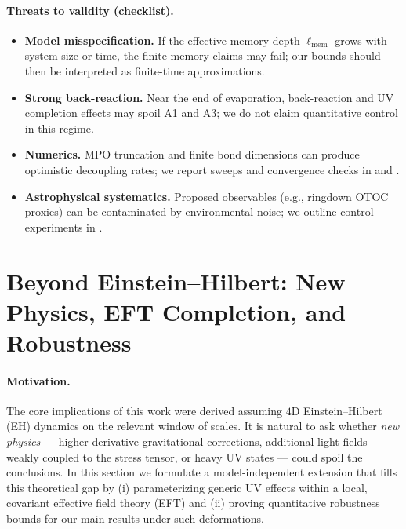 \documentclass[a4paper,11pt]{article}
\newcommand{\ellmem}{\ensuremath{\ell_{\mathrm{mem}}}}
\theoremstyle{plain}
\theoremstyle{definition}
\theoremstyle{remark}
\begin{document}
\paragraph{Threats to validity (checklist).}
\begin{itemize}[leftmargin=*,itemsep=0.25em]
  \item \textbf{Model misspecification.} If the effective memory depth $\ellmem$ grows with system size or time, the finite-memory claims may fail; our bounds should then be interpreted as finite-time approximations.
  \item \textbf{Strong back-reaction.} Near the end of evaporation, back-reaction and UV completion effects may spoil A1 and A3; we do not claim quantitative control in this regime.
  \item \textbf{Numerics.} MPO truncation and finite bond dimensions can produce optimistic decoupling rates; we report sweeps and convergence checks in  and .
  \item \textbf{Astrophysical systematics.} Proposed observables (e.g., ringdown OTOC proxies) can be contaminated by environmental noise; we outline control experiments in .
\end{itemize}






\section{Beyond Einstein--Hilbert: New Physics, EFT Completion, and Robustness}\label{sec:new-physics}

\paragraph{Motivation.} The core implications of this work were derived assuming $4$D Einstein--Hilbert (EH) dynamics on the relevant window of scales. It is natural to ask whether \emph{new physics} --- higher-derivative gravitational corrections, additional light fields weakly coupled to the stress tensor, or heavy UV states --- could spoil the conclusions. In this section we formulate a model-independent extension that fills this theoretical gap by (i) parameterizing generic UV effects within a local, covariant effective field theory (EFT) and (ii) proving quantitative robustness bounds for our main results under such deformations.
\end{document}
